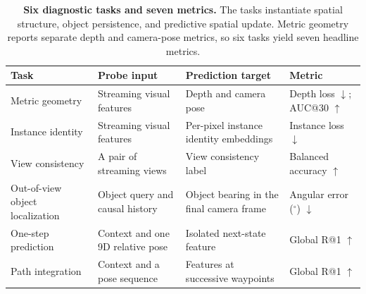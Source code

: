 \documentclass{article} %
\newcommand{\taskgeometry}{Metric geometry}
\newcommand{\taskonestep}{One-step prediction}
\newcommand{\taskpathintegration}{Path integration}
\newcommand{\taskidentity}{Instance identity}
\newcommand{\taskview}{View consistency}
\newcommand{\tasklocalization}{Out-of-view object localization}
\begin{document}
\begin{table}[tbp]
  \centering
  \caption{\textbf{Six diagnostic tasks and seven metrics.}
  The tasks instantiate spatial structure, object persistence, and predictive
  spatial update. Metric geometry reports separate depth and camera-pose metrics,
  so six tasks yield seven headline metrics.}
  \label{tab:benchmark-tasks}
  \small
  \setlength{\tabcolsep}{4pt}
  \begin{tabularx}{\textwidth}{@{}>{\raggedright\arraybackslash}p{}
    >{\raggedright\arraybackslash}X
    >{\raggedright\arraybackslash}X
    >{\raggedright\arraybackslash}p{}@{}}
    \toprule
    \rowcolor{morandiheader}
    Task & Probe input & Prediction target & Metric \\
    \midrule
    \cellcolor{structblue}\taskgeometry{} &
      Streaming visual features & Depth and camera pose &
      Depth loss $\downarrow$; AUC@30 $\uparrow$ \\
    \cellcolor{structblue}\taskidentity{} &
      Streaming visual features & Per-pixel instance identity embeddings &
      Instance loss $\downarrow$ \\
    \cellcolor{structblue}\taskview{} &
      A pair of streaming views & View consistency label &
      Balanced accuracy $\uparrow$ \\
    \midrule
    \cellcolor{memorygreen}\tasklocalization{} &
      Object query and causal history & Object bearing in the final camera frame &
      Angular error ($^{\circ}$) $\downarrow$ \\
    \midrule
    \cellcolor{predictorange}\taskonestep{} &
      Context and one 9D relative pose & Isolated next-state feature &
      Global R@1 $\uparrow$ \\
    \cellcolor{predictorange}\taskpathintegration{} &
      Context and a pose sequence & Features at successive waypoints &
      Global R@1 $\uparrow$ \\
    \bottomrule
  \end{tabularx}
\end{table}
\end{document}
